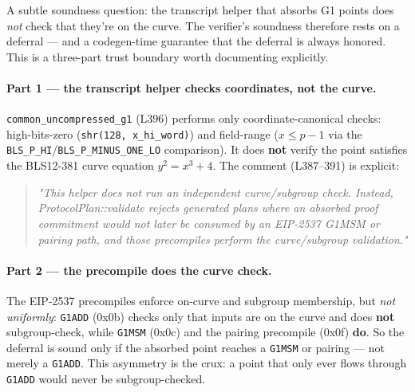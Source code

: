 A subtle soundness question: the transcript helper that absorbs G1
points does \emph{not} check that they're on the curve. The
verifier's soundness therefore rests on a deferral --- and a
codegen-time guarantee that the deferral is always honored. This
is a three-part trust boundary worth documenting explicitly.

\paragraph{Part 1 --- the transcript helper checks coordinates, not the curve.}
\texttt{common\_\allowbreak{}uncompressed\_\allowbreak{}g1} (L396) performs only
coordinate-canonical checks: high-bits-zero
(\texttt{shr(128, x\_\allowbreak{}hi\_\allowbreak{}word)}) and field-range
($x \le p-1$ via the \texttt{BLS\_P\_HI}/\texttt{BLS\_\allowbreak{}P\_\allowbreak{}MINUS\_\allowbreak{}ONE\_\allowbreak{}LO}
comparison). It does \textbf{not} verify the point satisfies the
BLS12-381 curve equation $y^2 = x^3 + 4$. The comment (L387--391)
is explicit:
\begin{quote}
\emph{"This helper does not run an independent curve/subgroup
check. Instead, ProtocolPlan::validate rejects generated plans
where an absorbed proof commitment would not later be consumed by
an EIP-2537 G1MSM or pairing path, and those precompiles perform
the curve/subgroup validation."}
\end{quote}

\paragraph{Part 2 --- the precompile does the curve check.} The
EIP-2537 precompiles enforce on-curve and subgroup membership,
but \emph{not uniformly}: \texttt{G1ADD} (0x0b) checks only that
inputs are on the curve and does \textbf{not} subgroup-check, while
\texttt{G1MSM} (0x0c) and the pairing
precompile (0x0f) \textbf{do}. So the deferral is sound only if
the absorbed point reaches a \texttt{G1MSM} or pairing --- not
merely a \texttt{G1ADD}. This asymmetry is the crux: a point that
only ever flows through \texttt{G1ADD} would never be
subgroup-checked.

